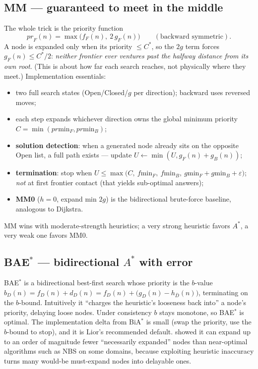\documentclass[11pt]{article}
\newcommand{\gF}{g_F}
\newcommand{\gB}{g_B}
\newcommand{\fF}{f_F}
\newcommand{\Cstar}{C^{*}}
\begin{document}
\subsection{MM --- guaranteed to meet in the middle \citep{holte2017mm}}
The whole trick is the priority function
\begin{equation}
  \mathit{pr}_F(n)=\max\bigl(\fF(n),\ 2\,\gF(n)\bigr)
  \qquad(\text{backward symmetric}).
  \label{eq:mm}
\end{equation}
A node is expanded only when its priority $\le\Cstar$, so the $2g$ term forces
$\gF(n)\le\Cstar/2$: \emph{neither frontier ever ventures past the halfway distance from its
own root}. (This is about how far each search reaches, not physically where they meet.)
Implementation essentials:
\begin{itemize}[leftmargin=1.4em,itemsep=1pt]
  \item two full search states (Open/Closed/$g$ per direction); backward uses reversed moves;
  \item each step expands whichever direction owns the global minimum priority
        $C=\min(\mathit{pr}\text{min}_F,\mathit{pr}\text{min}_B)$;
  \item \textbf{solution detection}: when a generated node already sits on the opposite Open
        list, a full path exists --- update $U\leftarrow\min(U,\gF(n)+\gB(n))$;
  \item \textbf{termination}: stop when
        $U\le\max\!\bigl(C,\ f\mathrm{min}_F,\ f\mathrm{min}_B,\
        g\mathrm{min}_F+g\mathrm{min}_B+\varepsilon\bigr)$;
        \emph{not} at first frontier contact (that yields sub-optimal answers);
  \item \textbf{MM0} ($h{=}0$, expand min $2g$) is the bidirectional brute-force baseline,
        analogous to Dijkstra.
\end{itemize}
MM wins with moderate-strength heuristics; a very strong heuristic favors $A^{*}$, a very
weak one favors MM0.

\subsection{BAE$^{*}$ --- bidirectional $A^{*}$ with error \citep{alcazar2020unifying,siag2025bridging}}
BAE$^{*}$ is a bidirectional best-first search whose priority is the $b$-value
$b_D(n)=f_D(n)+d_D(n)=f_D(n)+\bigl(g_D(n)-h_{\bar D}(n)\bigr)$, terminating on the $b$-bound.
Intuitively it ``charges the heuristic's looseness back into'' a node's priority, delaying
loose nodes. Under consistency $b$ stays monotone, so BAE$^{*}$ is optimal. The
implementation delta from BiA$^{*}$ is small (swap the priority, use the $b$-bound to stop),
and it is Lior's recommended default. \citet{alcazar2020unifying} showed it can expand up to
an order of magnitude fewer ``necessarily expanded'' nodes than near-optimal algorithms such
as NBS on some domains, because exploiting heuristic inaccuracy turns many would-be
must-expand nodes into delayable ones.
\end{document}
